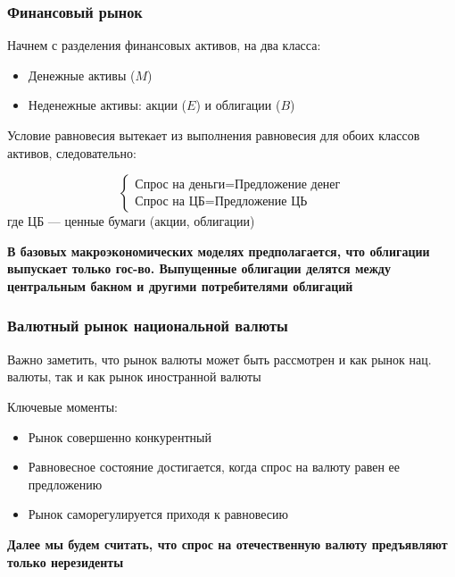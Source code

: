 \documentclass{article}
\begin{document}
    \subsubsection{Финансовый рынок}

    Начнем с разделения финансовых активов, на два класса:

    \begin{itemize}
        \item Денежные активы ($M$)
        \item Неденежные активы: акции ($E$) и облигации ($B$)
    \end{itemize}

    Условие равновесия вытекает из выполнения равновесия для обоих классов активов, следовательно:


    \[
    \begin{cases}
    \text{Спрос на деньги} = \text{Предложение денег} \\
    \text{Спрос на ЦБ} = \text{Предложение ЦЬ}
    \end{cases}
    \]
    где ЦБ --- ценные бумаги (акции, облигации)

    \quad
    
    \textbf{В базовых макроэкономических моделях предполагается,
        что облигации выпускает только гос-во.
        Выпущенные облигации делятся между центральным
        бакном и другими потребителями облигаций}

    \subsubsection{Валютный рынок национальной валюты}

    Важно заметить, что рынок валюты может быть рассмотрен и как рынок нац. валюты, так и как рынок иностранной валюты

    \quad

    Ключевые моменты:

    \begin{itemize}
        \item Рынок совершенно конкурентный
        \item Равновесное состояние достигается, когда спрос на валюту равен ее предложению
        \item Рынок саморегулируется приходя к равновесию
    \end{itemize}
    
    \quad
    
    \textbf{Далее мы будем считать, что спрос на отечественную валюту предъявляют только нерезиденты}
\end{document}
